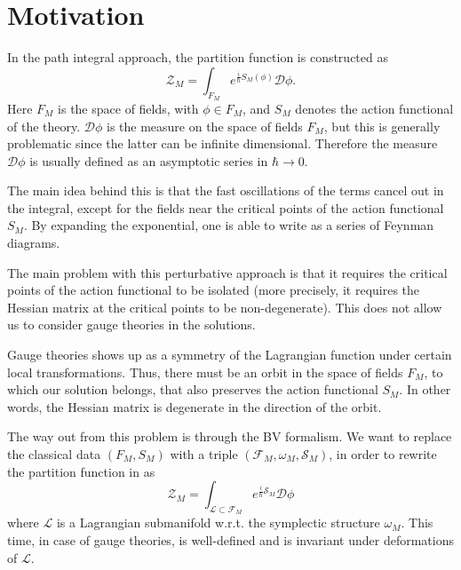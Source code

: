 \section{Motivation}
\label{sec:motivation}

In the path integral approach, the partition function is constructed as 
\begin{equation}
\label{eq:parti_func}
    \mathcal{Z}_M = \int_{F_M} e^{\frac{i}{\hbar}S_M(\phi)} \mathcal{D}\phi .
\end{equation}
Here $F_M$ is the space of fields, with $\phi \in F_M$, and $S_M$ denotes the action functional of the theory.
$\mathcal{D} \phi$ is the measure on the space of fields $F_M$, but this is generally problematic since the latter can be infinite dimensional.
Therefore the measure $\mathcal{D} \phi$ is usually defined as an asymptotic series in $\hbar \rightarrow 0$.

The main idea behind this is that the fast oscillations of the terms cancel out in the integral, except for the fields near the critical points of the action functional $S_M$.
By expanding the exponential, one is able to write  as a series of Feynman diagrams.

The main problem with this perturbative approach is that it requires the critical points of the action functional to be isolated (more precisely, it requires the Hessian matrix at the critical points to be non-degenerate).
This does not allow us to consider gauge theories in the solutions.

Gauge theories shows up as a symmetry of the Lagrangian function under certain local transformations.
Thus, there must be an orbit in the space of fields $F_M$, to which our solution belongs, that also preserves the action functional $S_M$.
In other words, the Hessian matrix is degenerate in the direction of the orbit.

The way out from this problem is through the BV formalism.
We want to replace the classical data $(F_M, S_M)$ with a triple $(\mathcal{F}_M, \omega_M, \mathcal{S}_M)$, in order to rewrite the partition function in   as
\begin{equation}
\label{eq:part_func_M}
    \mathcal{Z}_M = \int_{\mathcal{L} \subset \mathcal{F}_M} e^{\frac{i}{\hbar} \mathcal{S}_M} \mathcal{D} \phi
\end{equation}
where $\mathcal{L}$ is a Lagrangian submanifold w.r.t. the symplectic structure $\omega_M$.
This time, in case of gauge theories,  is well-defined and is invariant under deformations of $\mathcal{L}$.
